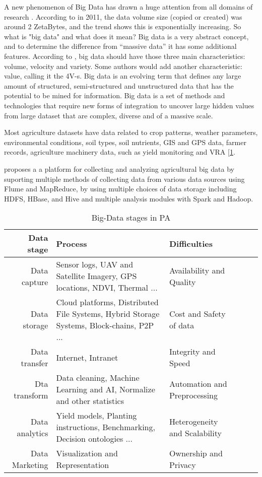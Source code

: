 \documentclass[review]{elsarticle}
\begin{document}
    A new phenomenon of Big Data has drawn a huge attention from all domains of research \cite{Wolfert_2017}. According to \cite{Li_2018} in 2011, the data volume size (copied or created) was around 2 ZetaBytes, and the trend shows this is exponentially increasing. So what is "big data" and what does it mean? Big data is a very abstract concept, and to determine the difference from “massive data” it has some additional features. According to  \cite{_zk_se_2015}, big data should have those three main characteristics: volume, velocity and variety. Some authors would add another characteristic: value, calling it the 4V-s. Big data is an evolving term that defines any large amount of structured, semi-structured and unstructured data that has the potential to be mined for information. Big data is a set of methods and technologies that require new forms of integration to uncover large hidden values from large dataset that are complex, diverse and of a massive scale.

    Most agriculture datasets have data related to crop patterns, weather parameters, environmental conditions, soil types, soil nutrients, GIS and GPS data, farmer records, agriculture machinery data, such as yield monitoring and VRA [\ref{tab:bigdata}.

    \cite{Nguyen_2017} proposes a a platform for collecting and analyzing agricultural big data by suporting multiple methods of collecting data from various data sources using Flume and MapReduce, by using multiple choices of data storage including HDFS, HBase, and Hive and multiple analysis modules with Spark and Hadoop.

    \begin{table}[t]
        \centering
        \begin{tabular}{r p{5cm} l p{5cm} l p{5cm}}
            Data stage              & Process          & Difficulties \\ 
            \hline
            Data capture        & Sensor logs, UAV and Satellite Imagery, GPS locations, NDVI, Thermal ...    & Availability and Quality \\
            Data storage        & Cloud platforms, Distributed File Systems, Hybrid Storage Systems, Block-chains, P2P ...      & Cost and Safety of data \\
            Data transfer       & Internet, Intranet       & Integrity and Speed \\
            Dta transform       & Data cleaning, Machine Learning and AI, Normalize and other statistics      & Automation and Preprocessing \\
            Data analytics      & Yield models, Planting instructions, Benchmarking, Decision ontologies ...          & Heterogeneity and Scalability \\
            Data Marketing      & Visualization and Representation      & Ownership and Privacy \\
            \hline
        \end{tabular}
        \caption{Big-Data stages in PA} \label{tab:bigdata} 
    \end{table}
\end{document}
